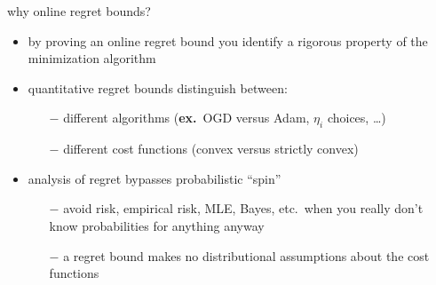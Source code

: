 \documentclass[xcolor={svgnames},
               hyperref={colorlinks,citecolor=DeepPink4,linkcolor=FireBrick,urlcolor=Maroon}]
               {beamer}
\begin{document}
\begin{frame}{why online regret bounds?}

\begin{itemize}
\item by proving an online regret bound you identify a rigorous property of the minimization algorithm
\item quantitative regret bounds distinguish between:
    \begin{itemize}
    \item[$-$] different algorithms (\textbf{ex.}~OGD versus Adam, $\eta_i$ choices, \dots)
    \item[$-$] different cost functions (convex versus strictly convex)
    \end{itemize}
\item analysis of regret bypasses probabilistic ``spin''
    \begin{itemize}
    \item[$-$] avoid risk, empirical risk, MLE, Bayes, etc.~when you really don't know probabilities for anything anyway
    \item[$-$] a regret bound makes no distributional assumptions about the cost functions
    \end{itemize}
\end{itemize}
\end{frame}
\end{document}
